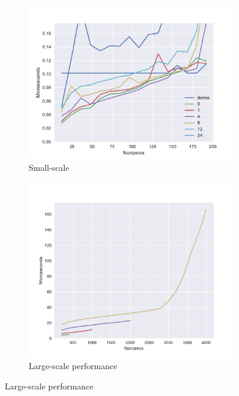   \begin{figure}[!htb]
    \centering
    \begin{subfigure}[b]{0.8\textwidth}
      \centering
      \includegraphics[width=\textwidth]{images/jump_penalty.pdf}
      \caption{Small-scale }
      \label{fig:unrolled_time}
    \end{subfigure}
    \begin{subfigure}[b]{0.8\textwidth}
      \centering
      \includegraphics[width=\textwidth]{images/jump_scaling.pdf}
      \caption{Large-scale performance}
      \label{fig:unrolled_perf}
    \end{subfigure}
  \end{figure}



